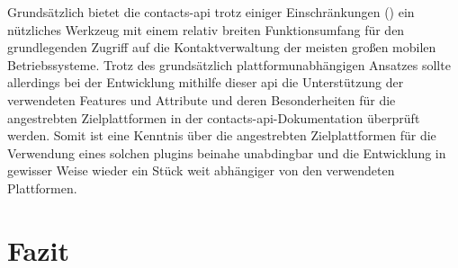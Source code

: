 Grundsätzlich bietet die \gls{contacts-api} trotz einiger Einschränkungen (\so) ein nützliches Werkzeug mit einem relativ breiten Funktionsumfang für den grundlegenden Zugriff auf die Kontaktverwaltung der meisten großen mobilen Betriebssysteme.
Trotz des grundsätzlich plattformunabhängigen Ansatzes sollte allerdings bei der Entwicklung mithilfe dieser \gls{api} die Unterstützung der verwendeten Features und Attribute und deren Besonderheiten für die angestrebten Zielplattformen in der \gls{contacts-api}-Dokumentation überprüft werden.
Somit ist eine Kenntnis über die angestrebten Zielplattformen für die Verwendung eines solchen \glspl{plugin} beinahe unabdingbar und die Entwicklung in gewisser Weise wieder ein Stück weit abhängiger von den verwendeten Plattformen. %



\chapter{Fazit} %
